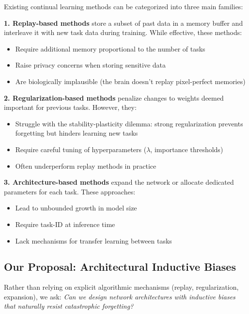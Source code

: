 \documentclass[11pt,twocolumn]{article}
\begin{document}
Existing continual learning methods can be categorized into three main families:

\textbf{1. Replay-based methods} \cite{rebuffi2017icarl, chaudhry2019tiny, buzzega2020dark} store a subset of past data in a memory buffer and interleave it with new task data during training. While effective, these methods:
\begin{itemize}
    \item Require additional memory proportional to the number of tasks
    \item Raise privacy concerns when storing sensitive data
    \item Are biologically implausible (the brain doesn't replay pixel-perfect memories)
\end{itemize}

\textbf{2. Regularization-based methods} \cite{kirkpatrick2017overcoming, zenke2017continual, aljundi2018memory} penalize changes to weights deemed important for previous tasks. However, they:
\begin{itemize}
    \item Struggle with the stability-plasticity dilemma: strong regularization prevents forgetting but hinders learning new tasks
    \item Require careful tuning of hyperparameters ($\lambda$, importance thresholds)
    \item Often underperform replay methods in practice
\end{itemize}

\textbf{3. Architecture-based methods} \cite{rusu2016progressive, serra2018overcoming} expand the network or allocate dedicated parameters for each task. These approaches:
\begin{itemize}
    \item Lead to unbounded growth in model size
    \item Require task-ID at inference time
    \item Lack mechanisms for transfer learning between tasks
\end{itemize}

\subsection{Our Proposal: Architectural Inductive Biases}

Rather than relying on explicit algorithmic mechanisms (replay, regularization, expansion), we ask: \textit{Can we design network architectures with inductive biases that naturally resist catastrophic forgetting?}
\end{document}
